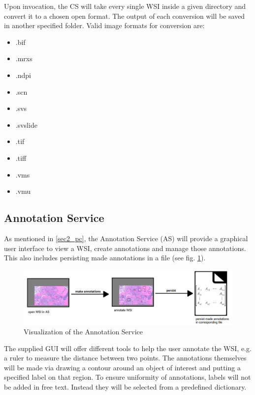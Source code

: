 Upon invocation, the CS will take every single WSI inside a given directory and convert it to a chosen open format. The output of each conversion will be saved in another specified folder. Valid image formats for conversion are:

\begin{itemize}
	\item .bif
	\item .mrxs
	\item .ndpi
	\item .scn
	\item .svs
	\item .svslide
	\item .tif
	\item .tiff
	\item .vms
	\item .vmu
\end{itemize}


\subsection{Annotation Service}
\label{sec2_as}
As mentioned in \ref{sec2_pc}, the Annotation Service (AS) will provide a graphical user interface to view a WSI, create annotations and manage those annotations. This also includes persisting made annotations in a file (see fig. \ref{fig2_processChainB}).

\begin{figure}[H]
	\begin{center}
		\includegraphics[scale=0.2]{img/processChainB.png}
		\caption{Visualization of the Annotation Service}
		\label{fig2_processChainB}
	\end{center}
\end{figure}

The supplied GUI will offer different tools to help the user annotate the WSI, e.g. a ruler to measure the distance between two points. The annotations themselves will be made via drawing a contour around an object of interest and putting a specified label on that region. To ensure uniformity of annotations, labels will not be added in free text. Instead they will be selected from a predefined dictionary.


